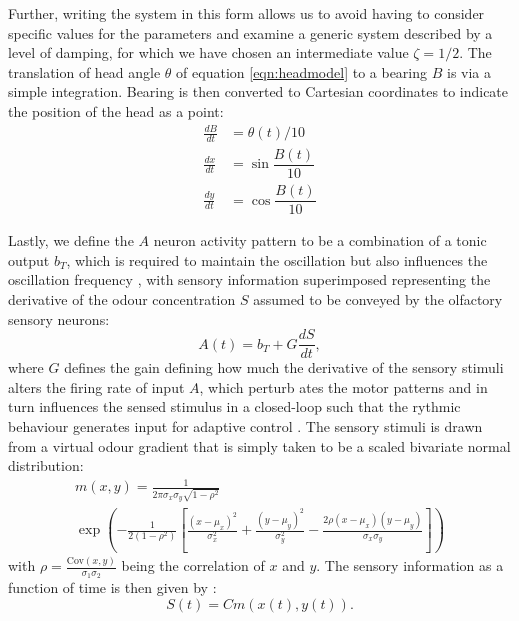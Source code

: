 \documentclass[10pt,a4paper]{article}
\newcommand{\Cov}{\mathrm{Cov}}
\begin{document}
 Further, writing the system in this form allows us to avoid having to consider specific values for the parameters and examine a generic system described by a level of damping, for which we have chosen an intermediate value $\zeta=1/2$.
The translation of head angle $\theta$ of equation \ref{eqn:headmodel} to a bearing $B$ is via a simple integration. Bearing is then converted to Cartesian coordinates to indicate the position of the head as a point:
\begin{align}
\frac{dB}{dt} &= \theta(t)/10 \\
\frac{dx}{dt} &= \sin{\dfrac{B(t)}{10}} \\
\frac{dy}{dt} &= \cos{\dfrac{B(t)}{10}}
\end{align}
   
Lastly, we define the $A$ neuron activity pattern to be a combination of a tonic output $b_T$, which is required to maintain the oscillation but also influences the oscillation frequency \cite{lansner1997realistic}, with sensory information superimposed representing the derivative of the odour concentration $S$ assumed to be conveyed by the olfactory sensory neurons: 
\begin{equation}
A(t) = b_T + G \frac{dS}{dt},
\end{equation}
where $G$ defines the gain defining how much the derivative of the sensory stimuli alters the firing  rate of input $A$, which perturb ates the motor patterns and in turn influences the sensed stimulus in a closed-loop such that the rythmic behaviour generates input for adaptive control \cite[see][]{willis1997centrally}.
The sensory stimuli is drawn from a virtual odour gradient that is simply taken to be a scaled bivariate normal distribution:
\begin{multline}
m(x,y) = \frac{1}{2 \pi  \sigma_x \sigma_y \sqrt{1-\rho^2}}\\
      \exp\left(
        -\frac{1}{2(1-\rho^2)}
        \left[
          \frac{(x-\mu_x)^2}{\sigma_x^2} + 
          \frac{(y-\mu_y)^2}{\sigma_y^2} -
          \frac{2\rho(x-\mu_x)(y-\mu_y)}{\sigma_x \sigma_y} \right]\right)
\label{eqn:bivariateNormal}
\end{multline}
with $\rho = \frac{\Cov(x,y)}{\sigma_1 \sigma_2}$ being the correlation of $x$ and $y$.
The sensory information as a function of time is then given by :
\begin{equation}
S(t) = C m(x(t),y(t)).
\label{eq:SensoryFunction}
\end{equation}
\end{document}
